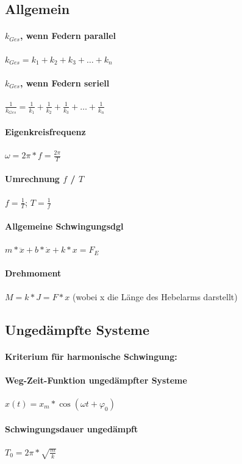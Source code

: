 \documentclass[12pt, a4paper]{scrreprt}
\begin{document}
\subsection{Allgemein}

\paragraph{\(k_{Ges}\), wenn Federn parallel} \dotfill \(k_{Ges}=k_1+k_2+k_3+ \dots +k_n\)
\paragraph{\(k_{Ges}\), wenn Federn seriell} \dotfill \(\frac{1}{k_{Ges}}=\frac{1}{k_1}+\frac{1}{k_2}+\frac{1}{k_3}+ \dots +\frac{1}{k_n}\)
\paragraph{Eigenkreisfrequenz} \dotfill \(\omega=2\pi*f=\frac{2\pi}{T}\)
\paragraph{Umrechnung \(f\) / \(T\)}\dotfill \(f=\frac{1}{T}\); \(T=\frac{1}{f}\)
\paragraph{Allgemeine Schwingungsdgl} \dotfill \(m* \ddot x + b*\dot x + k *x=F_E\)
\paragraph{Drehmoment} \dotfill \(M = k * J = F * x\) (wobei x die Länge des Hebelarms darstellt)


\subsection{Ungedämpfte Systeme}

\paragraph{Kriterium für harmonische Schwingung: } 
\paragraph{Weg-Zeit-Funktion ungedämpfter Systeme} \dotfill \(x(t)=x_m* \cos(\omega t + \varphi_0)\)
\paragraph{Schwingungsdauer ungedämpft} \dotfill \(T_0=2\pi*\sqrt{\frac{m}{k}}\)
\end{document}
